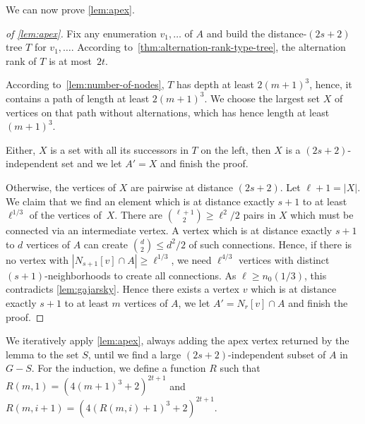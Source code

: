 We can now prove \cref{lem:apex}. 

\begin{proof}[of \cref{lem:apex}]
Fix any enumeration $v_1,\ldots$ of $A$ and
build the distance-$(2s+2)$ tree $T$ for
$v_1,\ldots$. According to~\cref{thm:alternation-rank-type-tree}, 
the alternation rank of $T$ is at most~$2t$. 

According 
to~\cref{lem:number-of-nodes}, $T$ has depth at least $2(m+1)^3$, hence, 
it contains a path of length at least $2(m+1)^3$. We choose the largest set $X$
of vertices on that path without alternations, which has hence length
at least $(m+1)^3$. 

Either, $X$ is a set with all its successors in $T$ on the left, 
then $X$ is a $(2s+2)$-independent set and we let $A'=X$ and finish the proof.

Otherwise, the vertices of $X$ are pairwise at distance $(2s+2)$. Let $\ell+1=|X|$. 
We claim that we find an element which is at distance exactly $s+1$ 
to at least $\ell^{1/3}$
of the vertices of~$X$. There are $\binom{\ell+1}{2}\geq \ell^2/2$ pairs in $X$ which 
must be connected via an intermediate vertex. A vertex which is at distance
exactly $s+1$ to $d$ vertices of $A$ can create $\binom{d}{2}\leq d^2/2$ of such connections. 
Hence, if there is no vertex with $|N_{s+1}[v]\cap A|\geq \ell^{1/3}$, 
we need $\ell^{4/3}$ vertices with distinct $(s+1)$-neighborhoods
to create all connections. As $\ell\geq n_0(1/3)$, 
this contradicts \cref{lem:gajarsky}. Hence there exists a vertex $v$ which is 
at distance exactly $s+1$ to at least $m$ vertices of $A$, 
we let $A'=N_r[v]\cap A$ and finish the proof. 
\end{proof}

We iteratively apply \cref{lem:apex}, always adding the apex vertex 
returned by the lemma to the set $S$, until we find a large 
$(2s+2)$-independent subset of $A$ in $G-S$. For the induction, we
define a function $R$ such that $R(m,1)=(4(m+1)^3+2)^{2t+1}$
and $R(m, i+1)=(4(R(m,i)+1)^3+2)^{2t+1}$.

